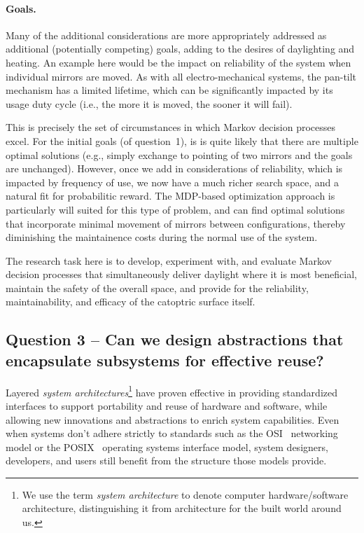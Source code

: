 \paragraph{Goals.}
Many of the additional considerations are more appropriately addressed as
additional (potentially competing) goals, adding to the desires of
daylighting and heating.  An example here would be the
impact on reliability of the system when individual mirrors are moved.  As
with all electro-mechanical systems, the pan-tilt mechanism has a limited
lifetime, which can be significantly impacted by its usage duty cycle
(i.e., the more it is moved, the sooner it will fail).

This is precisely the set of circumstances in which Markov decision
processes excel. For the initial goals (of question~1), is is quite
likely that there are multiple optimal solutions (e.g., simply exchange
to pointing of two mirrors and the goals are unchanged).  However,
once we add in considerations of reliability, which is impacted by
frequency of use, we now have a much richer search space,
and a natural fit for probabilitic reward.
The MDP-based optimization approach is particularly will suited for
this type of problem, and can find optimal solutions that incorporate
minimal movement of mirrors between configurations, thereby diminishing
the maintainence costs during the normal use of the system.

The research task here is to develop, experiment with, and evaluate
Markov decision processes that simultaneously deliver daylight where it
is most beneficial, maintain the safety of the overall space,
and provide for the reliability, maintainability, and efficacy of the
catoptric surface itself.

\subsection{Question 3 -- Can we design abstractions that encapsulate
subsystems for effective reuse?}

Layered \emph{system architectures}\footnote{We use the term
\emph{system architecture}
to denote computer hardware/software architecture, distinguishing it from
architecture for the built world around us.}
have proven effective in providing standardized interfaces to
support portability
and reuse of hardware and software,
while allowing new innovations and abstractions
to enrich system capabilities.
Even when systems don't adhere strictly to standards
such as the OSI~\cite{osi} networking model or the POSIX~\cite{posix} operating
systems interface model, system designers, developers,
and users still benefit
from the structure those models provide.

